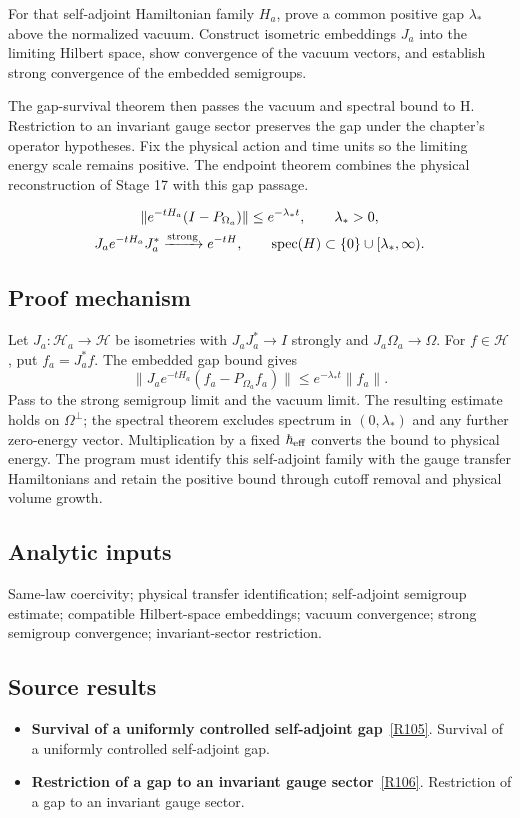 \documentclass[11pt,a4paper]{article}
\begin{document}
For that self-adjoint Hamiltonian family \(H_a\), prove a common positive gap \(\lambda_*\) above the normalized vacuum. Construct isometric embeddings \(J_a\) into the limiting Hilbert space, show convergence of the vacuum vectors, and establish strong convergence of the embedded semigroups.

The gap-survival theorem then passes the vacuum and spectral bound to H. Restriction to an invariant gauge sector preserves the gap under the chapter's operator hypotheses. Fix the physical action and time units so the limiting energy scale remains positive. The endpoint theorem combines the physical reconstruction of Stage 17 with this gap passage.


\begin{gather*}
\|e^{-tH_a}(I-P_{\Omega_a})\|\le e^{-\lambda_*t},\qquad \lambda_*>0,\\
J_ae^{-tH_a}J_a^*\xrightarrow{\rm strong}e^{-tH},\qquad
\operatorname{spec}(H)\subset\{0\}\cup[\lambda_*,\infty).
\end{gather*}
\subsection*{Proof mechanism}
Let \(J_a:\mathcal H_a\to\mathcal H\) be isometries with \(J_aJ_a^*\to I\) strongly and \(J_a\Omega_a\to\Omega\). For \(f\in\mathcal H\), put \(f_a=J_a^*f\). The embedded gap bound gives
\[\|J_ae^{-tH_a}(f_a-P_{\Omega_a}f_a)\|\le e^{-\lambda_*t}\|f_a\|.\]
Pass to the strong semigroup limit and the vacuum limit. The resulting estimate holds on \(\Omega^\perp\); the spectral theorem excludes spectrum in \((0,\lambda_*)\) and any further zero-energy vector. Multiplication by a fixed \(\hbar_{\rm eff}\) converts the bound to physical energy. The program must identify this self-adjoint family with the gauge transfer Hamiltonians and retain the positive bound through cutoff removal and physical volume growth.
\subsection*{Analytic inputs}
Same-law coercivity; physical transfer identification; self-adjoint semigroup estimate; compatible Hilbert-space embeddings; vacuum convergence; strong semigroup convergence; invariant-sector restriction.
\subsection*{Source results}
\begin{itemize}
\item \textbf{Survival of a uniformly controlled self-adjoint gap}~\hyperref[src:thm-mass-gap-rg-fixed-point]{[R105]}. Survival of a uniformly controlled self-adjoint gap.
\item \textbf{Restriction of a gap to an invariant gauge sector}~\hyperref[src:thm-gauge-sector-mass-gap]{[R106]}. Restriction of a gap to an invariant gauge sector.
\end{itemize}
\end{document}
